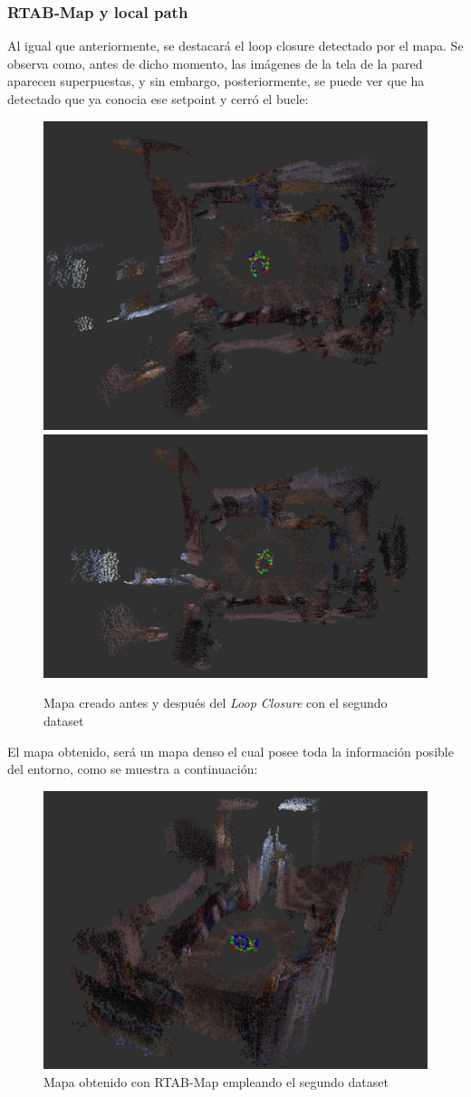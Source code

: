 \subsubsection{RTAB-Map y local path}
Al igual que anteriormente, se destacará el loop closure detectado por el mapa. Se observa como, antes de dicho momento, las imágenes de la tela de la pared aparecen superpuestas,
y sin embargo, posteriormente, se puede ver que ha detectado que ya conocia ese setpoint y cerró el bucle:
\begin{figure}[h!]
    \centering
    \includegraphics[width=.4\textwidth]{images/slam/bag3_rtabmap_noLC}
    \includegraphics[width=.51\textwidth]{images/slam/bag3_rtabmap_LC}
    \caption{Mapa creado antes y después del \textit{Loop Closure} con el segundo dataset}
\end{figure}

El mapa obtenido, será un mapa denso el cual posee toda la información posible del entorno, como se muestra a continuación:

\begin{figure}[h!]
    \centering
    \includegraphics[width=.7\textwidth]{images/slam/bag3_rtabmapbonito}
    \caption{Mapa obtenido con RTAB-Map empleando el segundo dataset}
\end{figure}
    

